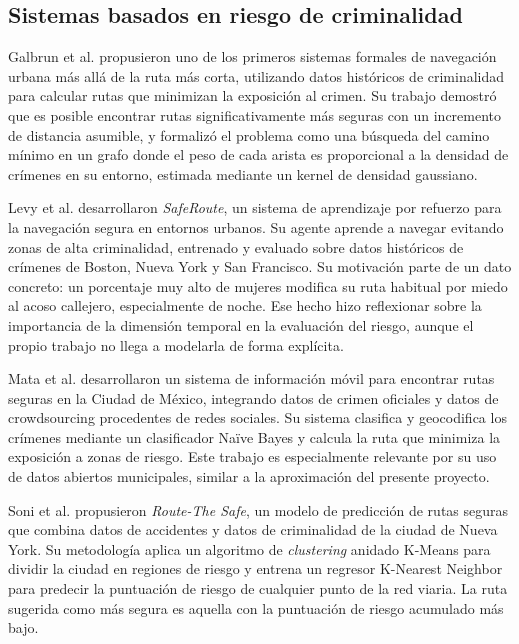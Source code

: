 \subsection{Sistemas basados en riesgo de criminalidad}
\label{subsec:trabajos_crimen}

Galbrun et al. \cite{galbrun2016} propusieron uno de los primeros sistemas formales de navegación urbana más allá de la ruta más corta, utilizando datos históricos de criminalidad para calcular rutas que minimizan la exposición al crimen. Su trabajo demostró que es posible encontrar rutas significativamente más seguras con un incremento de distancia asumible, y formalizó el problema como una búsqueda del camino mínimo en un grafo donde el peso de cada arista es proporcional a la densidad de crímenes en su entorno, estimada mediante un kernel de densidad gaussiano.

Levy et al. \cite{levy2020} desarrollaron \textit{SafeRoute}, un sistema de aprendizaje por refuerzo para la navegación segura en entornos urbanos. Su agente aprende a navegar evitando zonas de alta criminalidad, entrenado y evaluado sobre datos históricos de crímenes de Boston, Nueva York y San Francisco. Su motivación parte de un dato concreto: un porcentaje muy alto de mujeres modifica su ruta habitual por miedo al acoso callejero, especialmente de noche. Ese hecho hizo reflexionar sobre la importancia de la dimensión temporal en la evaluación del riesgo, aunque el propio trabajo no llega a modelarla de forma explícita.

Mata et al. \cite{mata2016} desarrollaron un sistema de información móvil para encontrar rutas seguras en la Ciudad de México, integrando datos de crimen oficiales y datos de crowdsourcing procedentes de redes sociales. Su sistema clasifica y geocodifica los crímenes mediante un clasificador Naïve Bayes y calcula la ruta que minimiza la exposición a zonas de riesgo. Este trabajo es especialmente relevante por su uso de datos abiertos municipales, similar a la aproximación del presente proyecto.

Soni et al. \cite{soni2019} propusieron \textit{Route-The Safe}, un modelo de predicción de rutas seguras que combina datos de accidentes y datos de criminalidad de la ciudad de Nueva York. Su metodología aplica un algoritmo de \textit{clustering} anidado K-Means para dividir la ciudad en regiones de riesgo y entrena un regresor K-Nearest Neighbor para predecir la puntuación de riesgo de cualquier punto de la red viaria. La ruta sugerida como más segura es aquella con la puntuación de riesgo acumulado más bajo.

